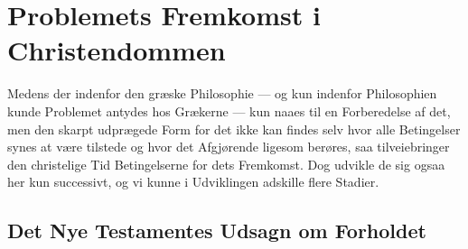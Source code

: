 \documentclass[12pt,a4paper]{book}
\newcommand{\opage}[1]{\marginnote{\footnotesize\textit{[#1]}}}
\begin{document}
\section{Problemets Fremkomst i Christendommen}
\label{sec:christendommen}

\noindent Medens der indenfor den græske Philosophie --- og kun indenfor
Philosophien kunde Problemet antydes hos \opage{15}Grækerne --- kun naaes til en
Forberedelse af det, men den skarpt udprægede Form for det ikke kan findes
selv hvor alle Betingelser synes at være tilstede og hvor det Afgjørende
ligesom berøres, saa tilveiebringer den christelige Tid Betingelserne for dets
Fremkomst. Dog udvikle de sig ogsaa her kun successivt, og vi kunne i
Udviklingen adskille flere Stadier.

\subsection{Det Nye Testamentes Udsagn om Forholdet}
\label{ssec:nt}
\end{document}
